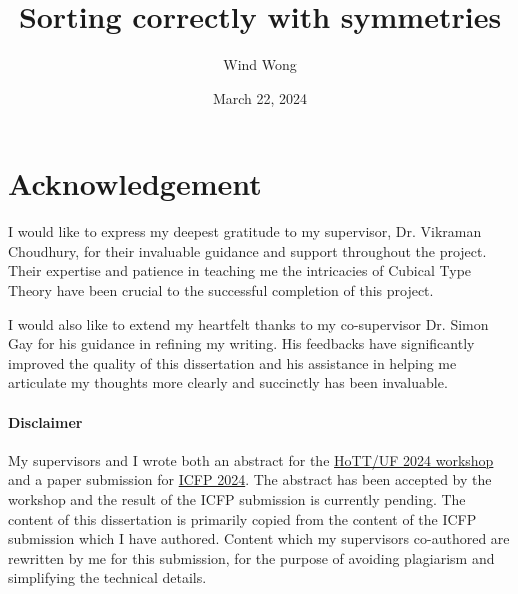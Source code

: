 \documentclass{l4proj}
\begin{document}
\title{Sorting correctly with symmetries}
\author{Wind Wong}
\date{March 22, 2024}

\maketitle

\begin{abstract}
    
\end{abstract}


%
%
\def\consentname {Tsz Fung Wind Wong} %
\def\consentdate {18 March 2024} %
%
\educationalconsent

\newpage
\chapter*{Acknowledgement}
I would like to express my deepest gratitude to my supervisor,
Dr. Vikraman Choudhury, for their invaluable guidance and support
throughout the project. Their expertise and patience in teaching me
the intricacies of Cubical Type Theory have been crucial to the
successful completion of this project.

I would also like to extend my heartfelt thanks to my co-supervisor
Dr. Simon Gay for his guidance in refining my writing.
His feedbacks have significantly improved the quality of this dissertation
and his assistance in helping me articulate my thoughts more
clearly and succinctly has been invaluable.

\subsubsection{Disclaimer}
My supervisors and I wrote both an abstract for the
\href{https://hott-uf.github.io/2024/}{HoTT/UF 2024 workshop}
and a paper submission for \href{https://icfp24.sigplan.org/}{ICFP 2024}.
The abstract has been accepted by the workshop and the result of the
ICFP submission is currently pending. The content of this dissertation
is primarily copied from the content of the ICFP submission which I have
authored. Content which my supervisors co-authored are rewritten by me
for this submission, for the purpose of avoiding plagiarism and simplifying the
technical details.
\end{document}
